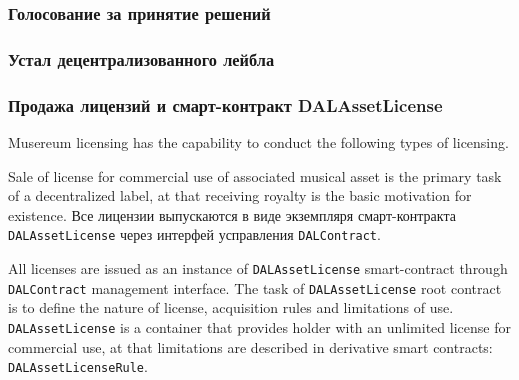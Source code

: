 \documentclass[12pt]{report}
\newcommand{\hlc}[1]{\colorbox{yellow!25}{#1}}
\def\code#1{\colorbox{light-gray}{\texttt{#1}}}
\begin{document}
\subsubsection{Голосование за принятие решений}
\label{tech-apps-dal-voting}
\subsubsection{Устал децентрализованного лейбла}
\label{tech-apps-dal-charter}
\subsubsection{Продажа лицензий и смарт-контракт DALAssetLicense}
\label{tech-apps-dal-license}
\begin{multicols}{2}

Musereum licensing has the capability to conduct the following types of licensing.

Sale of license for commercial use of associated musical asset is the primary task of a decentralized label, at that receiving royalty is the basic motivation for existence.
Все лицензии выпускаются в виде экземпляря смарт-контракта \code{DALAssetLicense} через интерфей усправления \code{DALContract}. 

All licenses are issued as \hlc{an instance} of \code{DALAssetLicense} smart-contract through \code{DALContract} management interface.
The task of \code{DALAssetLicense} root contract is to define the nature of license, acquisition rules and  limitations of use. \code{DALAssetLicense} is a container that provides holder with an unlimited license for commercial use, at that limitations are described in derivative smart contracts:
 \code{DALAssetLicenseRule}.

\end{multicols}
\end{document}
